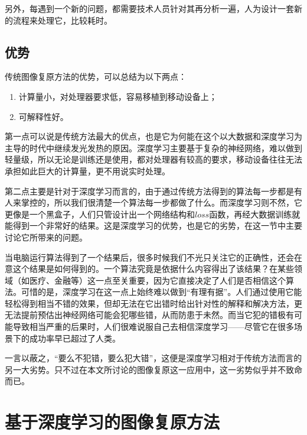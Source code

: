 \documentclass[UTF8]{ctexart}
\begin{document}
            \indent 另外，每遇到一个新的问题，都需要技术人员针对其再分析一遍，人为设计一套新的流程来处理它，比较耗时。
            
        \subsection{优势}\label{advantages_of_traditional_methods}
            \indent 传统图像复原方法的优势，可以总结为以下两点：
    			\begin{enumerate}[leftmargin=50pt]
    				\item 计算量小，对处理器要求低，容易移植到移动设备上；
    				\item 可解释性好\footnotemark[1]。
    			\end{enumerate}
      
            \indent 第一点可以说是传统方法最大的优点，也是它为何能在这个以大数据和深度学习为主导的时代中继续发光发热的原因。深度学习主要基于复杂的神经网络，难以做到轻量级，所以无论是训练还是使用，都对处理器有较高的要求，移动设备往往无法承担如此巨大的计算量，更不用说实时处理。
            
            \indent 第二点\footnotemark[1]主要是针对于深度学习而言的，由于通过传统方法得到的算法每一步都是有人来掌控的，所以我们很清楚一个算法每一步都做了什么。而深度学习则不然，它更像是一个黑盒子，人们只管设计出一个网络结构和$loss$函数，再经大数据训练就能得到一个非常好的结果。这是深度学习的优势，也是它的劣势，在这一节中主要讨论它所带来的问题。
            
            \indent 当电脑运行算法得到了一个结果后，很多时候我们不光只关注它的正确性，还会在意这个结果是如何得到的。一个算法究竟是依据什么内容得出了该结果？在某些领域（如医疗、金融等）这一点至关重要，因为它直接决定了人们是否相信这个算法。可惜的是，深度学习在这一点上始终难以做到“有理有据”。人们通过使用它能轻松得到相当不错的效果，但却无法在它出错时给出针对性的解释和解决方法，更无法提前预估出神经网络可能会犯哪些错，从而防患于未然。而当它犯的错极有可能导致相当严重的后果时，人们很难说服自己去相信深度学习——尽管它在很多场景下的成功率早已超过了人类。
            
            \indent 一言以蔽之，“要么不犯错，要么犯大错”，这便是深度学习相对于传统方法而言的另一大劣势。只不过在本文所讨论的图像复原这一应用中，这一劣势似乎并不致命而已。
            
    
    
    \section{基于深度学习的图像复原方法}\label{DeepLearning_methods}
    
\end{document}
